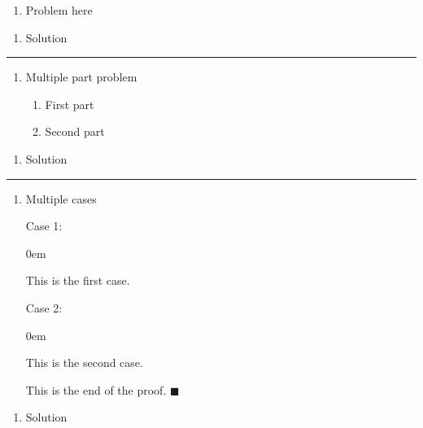 \documentclass{article}
\newcommand{\qed}{\hfill$\blacksquare$}
\newenvironment{problem}[1]    %
{
	\begin{enumerate}[leftmargin = 0in]
		\item[\bfseries{#1}]
}
{	\end{enumerate}
}
\newenvironment{multipart}
{
	\begin{enumerate}[leftmargin = *, align = left, label = {\alph*.}, topsep = 0pt]
}	
{
	\end{enumerate}
}
\newenvironment{proofcase}[1]
{
	\par
	#1
	\begin{addmargin}[1em]{0em}
}
{	
	\end{addmargin}
}
\newenvironment{solution}    %
{
	\begin{enumerate}[leftmargin=0in]
		\item[\bfseries{Solution}]
}
{
	\end{enumerate}
}
\begin{document}
	\begin{problem}{4.3.14}
		Problem here
	\end{problem}
	
	\begin{solution}
		Solution
	\end{solution}
	
\hrule %

	\begin{problem}{4.3.22}
		Multiple part problem
		\begin{multipart}
			\item First part
			\item Second part
		\end{multipart}
	\end{problem}

	\begin{solution}
		Solution
	\end{solution}
	
\hrule %

	\begin{problem}{4.6.20}
		Multiple cases
		\begin{proofcase}{Case 1:}
			This is the first case.
		\end{proofcase}
		\begin{proofcase}{Case 2:}
			This is the second case.
		\end{proofcase}
		This is the end of the proof. \qed
	\end{problem}

	\begin{solution}
		Solution
	\end{solution}
	
\end{document}
